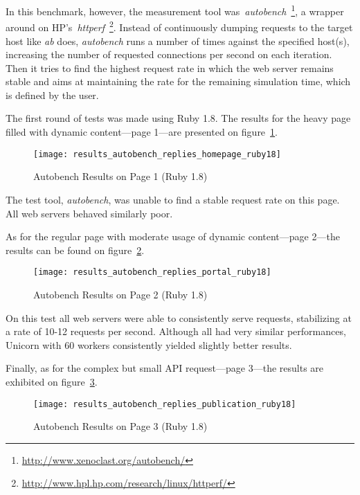 In this benchmark, however, the measurement tool was~\textit{autobench}~\footnote{\url{http://www.xenoclast.org/autobench/}}, a wrapper around on HP's~\textit{httperf}~\footnote{\url{http://www.hpl.hp.com/research/linux/httperf/}}. Instead of continuously dumping requests to the target host like \textit{ab} does, \textit{autobench} runs a number of times against the specified host(s), increasing the number of requested connections per second on each iteration. Then it tries to find the highest request rate in which the web server remains stable and aims at maintaining the rate for the remaining simulation time, which is defined by the user.

The first round of tests was made using Ruby 1.8. The results for the heavy page filled with dynamic content---page 1---are presented on figure~\ref{fig:page1_autobench_ruby18_results}.
\begin{figure}[h!t]
  \centering
    \caption{Autobench Results on Page 1 (Ruby 1.8)}
    \texttt{[image: results\_autobench\_replies\_homepage\_ruby18]}
  \label{fig:page1_autobench_ruby18_results}
\end{figure}

The test tool, \textit{autobench}, was unable to find a stable request rate on this page. All web servers behaved similarly poor. 

As for the regular page with moderate usage of dynamic content---page 2---the results can be found on figure~\ref{fig:page2_autobench_ruby18_results}.
\begin{figure}[h!t]
  \centering
    \caption{Autobench Results on Page 2 (Ruby 1.8)}
    \texttt{[image: results\_autobench\_replies\_portal\_ruby18]}
  \label{fig:page2_autobench_ruby18_results}
\end{figure}

On this test all web servers were able to consistently serve requests, stabilizing at a rate of 10-12 requests per second. Although all had very similar performances, Unicorn with 60 workers consistently yielded slightly better results.

Finally, as for the complex but small API request---page 3---the results are exhibited on figure~\ref{fig:page3_autobench_ruby18_results}.
\begin{figure}[h!t]
  \centering
    \caption{Autobench Results on Page 3 (Ruby 1.8)}
    \texttt{[image: results\_autobench\_replies\_publication\_ruby18]}
  \label{fig:page3_autobench_ruby18_results}
\end{figure}

